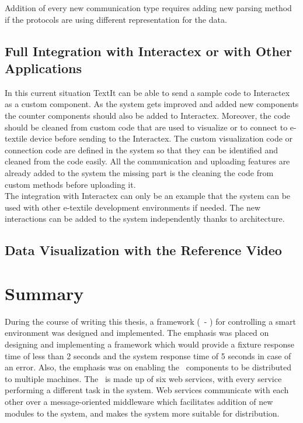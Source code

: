 Addition of every new communication type requires adding new parsing method if the protocols are using different representation for the data.

\subsection{Full Integration with Interactex or with Other Applications}
In this current situation TextIt can be able to send a sample code to Interactex as a custom component. As the system gets improved and added new components the counter components should also be added to Interactex. Moreover, the code should be cleaned from custom code that are used to visualize or to connect to e-textile device before sending to the Interactex. The custom visualization code or connection code are defined in the system so that they can be identified and cleaned from the code easily. All the communication and uploading features are already added to the system the missing part is the cleaning the code from custom methods before uploading it.\\ 

The integration with Interactex can only be an example that the system can be used with other e-textile development environments if needed. The new interactions can be added to the system independently thanks to architecture.

\subsection{Data Visualization with the Reference Video}


\section{Summary}
During the course of writing this thesis, a framework (\sife\ - \seif) for controlling a smart environment was designed and implemented. The emphasis was placed on designing and implementing a framework which would provide a fixture response time of less than 2 seconds and the system response time of 5 seconds in case of an error. Also, the emphasis was on enabling the \seif\ components to be distributed to multiple machines. The \seif\ is made up of six web services, with every service performing a different task in the system. Web services communicate with each other over a message-oriented middleware which facilitates addition of new modules to the system, and makes the system more suitable for distribution. \\ 

